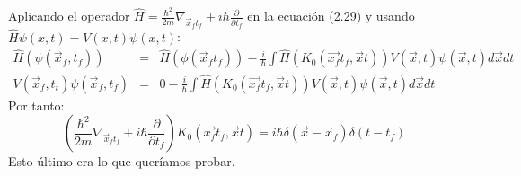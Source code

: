 Aplicando el operador $\hat{H}=\frac{\hbar^2}{2m}\nabla_{\vec{x}_ft_f}+i\hbar\frac{\partial}{\partial t_f}$ en la ecuación (2.29) y usando $\hat{H}\psi(x,t)=V(x,t)\psi(x,t)$:
\begin{eqnarray}
\nonumber \hat{H}(\psi(\vec{x}_f,t_f))&=&\hat{H}(\phi(\vec{x}_ft_f))-\frac{i}{\hbar}\int\hat{H} (K_{0}(\vec{x_{f}}t_{f},\vec{x}t))V(\vec{x},t)\psi(\vec{x},t)d\vec{x}dt\\
\nonumber V(\vec{x}_f,t_t)\psi(\vec{x}_f,t_f)&=&0-\frac{i}{\hbar}\int\hat{H} (K_{0}(\vec{x_{f}}t_{f},\vec{x}t))V(\vec{x},t)\psi(\vec{x},t)d\vec{x}dt
\end{eqnarray}
Por tanto:
\begin{equation}
\left(\frac{\hbar^2}{2m}\nabla_{\vec{x}_ft_f}+i\hbar\frac{\partial}{\partial t_f}\right)K_{0}(\vec{x_{f}}t_{f},\vec{x}t)=i\hbar\delta(\vec{x}-\vec{x}_f)\delta(t-t_f)
\end{equation}
Esto último era lo que queríamos probar.








